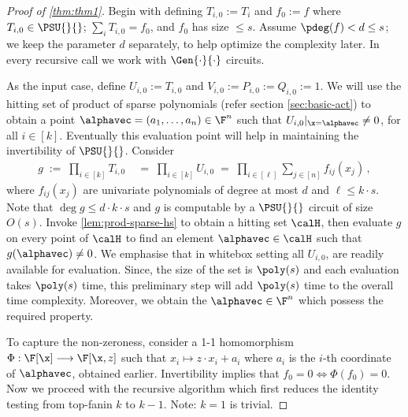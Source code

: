 \begin{proof}[Proof of \autoref{thm:thm1}] 
Begin with defining $T_{i,0}:=T_i$ and $f_{0}:=f$ where $T_{i,0} \in \PSU{}{}$;  $\sum_{i} T_{i,0}=f_0$, and $f_0$ has size $\le s$. Assume $\pdeg(f)<d\le s$; we keep the parameter $d$ separately, to help optimize the complexity later. In every recursive call we work with $\Gen{\cdot}{\cdot}$ circuits. 

As the input case, define $U_{i,0}:=T_{i,0}$ and $V_{i,0}:=P_{i,0}:= Q_{i,0}:=1$. We will use the hitting set of product of sparse polynomials (refer section \ref{sec:basic-act}) to obtain a point $\alphavec = (a_1, \dots, a_n) \in \F^n$ such that $U_{i,0} \rvert_{\x = \alphavec} \neq 0$, for all $i \in [k]$. Eventually this evaluation point will help in maintaining the invertibility of $\PSU{}{}$. Consider
\begin{align*}
    g \;:=\; \prod_{i \in [k]} T_{i,0} &\;=\; \prod_{i \in [k]} U_{i,0} \;=\; \prod_{i \in [\ell]} \sum_{j \in [n]} f_{ij}(x_j)\,,
\end{align*}
where $f_{ij}(x_j)$ are univariate polynomials of degree at most $d$ and $\ell \leq k \cdot s$. Note that $\deg g \leq d \cdot k \cdot s$ and $g$ is computable by a $\PSU{}{}$ circuit of size $O(s)$. Invoke \autoref{lem:prod-sparse-hs} to obtain a hitting set $\calH$, then evaluate $g$ on every point of $\calH$ to find an element $\alphavec \in \calH$ such that $g(\alphavec) \neq 0$. We emphasise that in whitebox setting all $U_{i,0}$, are readily available for evaluation. Since, the size of the set is $\poly(s)$ and each evaluation takes $\poly(s)$ time, this preliminary step will add $\poly(s)$ time to the overall time complexity. Moreover, we obtain the $\alphavec \in \F^n$ which possess the required property. 

To capture the non-zeroness, consider a 1-1 homomorphism $\Phi : \F[\x] \longrightarrow \F[\x,z]$ such that $x_i \mapsto z\cdot x_i + a_i$ where $a_i$ is the $i$-th coordinate of $\alphavec$, obtained earlier. Invertibility implies that $f_{0} = 0 \iff \Phi(f_{0}) = 0$. 
%
%
Now we proceed with the recursive algorithm which first reduces the identity testing from top-fanin $k$ to $k-1$. Note: $k=1$ is trivial.


\end{proof}
